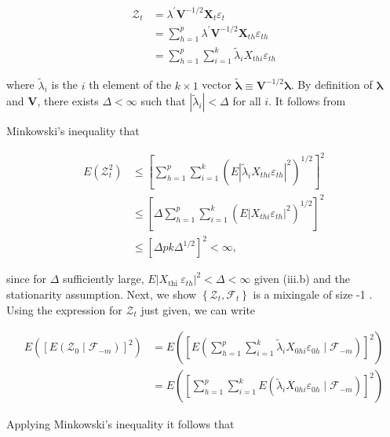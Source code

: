 \documentclass[10pt]{article}
\begin{document}
$$
\begin{aligned}
\mathcal{Z}_{t} & =\lambda^{\prime} \mathbf{V}^{-1 / 2} \mathbf{X}_{t} \varepsilon_{t} \\
& =\sum_{h=1}^{p} \lambda^{\prime} \mathbf{V}^{-1 / 2} \mathbf{X}_{t h} \varepsilon_{t h} \\
& =\sum_{h=1}^{p} \sum_{i=1}^{k} \tilde{\lambda}_{i} X_{t h i} \varepsilon_{t h}
\end{aligned}
$$

where $\tilde{\lambda}_{i}$ is the $i$ th element of the $k \times 1$ vector $\tilde{\boldsymbol{\lambda}} \equiv \mathbf{V}^{-1 / 2} \boldsymbol{\lambda}$. By definition of $\boldsymbol{\lambda}$ and $\mathbf{V}$, there exists $\Delta<\infty$ such that $\left|\tilde{\lambda}_{i}\right|<\Delta$ for all $i$. It follows from

Minkowski's inequality that

$$
\begin{aligned}
E\left(\mathcal{Z}_{t}^{2}\right) & \leq\left[\sum_{h=1}^{p} \sum_{i=1}^{k}\left(E\left|\tilde{\lambda}_{i} X_{t h i} \varepsilon_{t h}\right|^{2}\right)^{1 / 2}\right]^{2} \\
& \leq\left[\Delta \sum_{h=1}^{p} \sum_{i=1}^{k}\left(E\left|X_{t h i} \varepsilon_{t h}\right|^{2}\right)^{1 / 2}\right]^{2} \\
& \leq\left[\Delta p k \Delta^{1 / 2}\right]^{2}<\infty,
\end{aligned}
$$

since for $\Delta$ sufficiently large, $E\left|X_{\text {thi }} \varepsilon_{t h}\right|^{2}<\Delta<\infty$ given (iii.b) and the stationarity assumption. Next, we show $\left\{\mathcal{Z}_{t}, \mathcal{F}_{t}\right\}$ is a mixingale of size -1 . Using the expression for $\mathcal{Z}_{t}$ just given, we can write

$$
\begin{aligned}
E\left(\left[E\left(\mathcal{Z}_{0} \mid \mathcal{F}_{-m}\right)\right]^{2}\right) & =E\left(\left[E\left(\sum_{h=1}^{p} \sum_{i=1}^{k} \tilde{\lambda}_{i} X_{0 h i} \varepsilon_{0 h} \mid \mathcal{F}_{-m}\right)\right]^{2}\right) \\
& =E\left(\left[\sum_{h=1}^{p} \sum_{i=1}^{k} E\left(\tilde{\lambda}_{i} X_{0 h i} \varepsilon_{0 h} \mid \mathcal{F}_{-m}\right)\right]^{2}\right)
\end{aligned}
$$

Applying Minkowski's inequality it follows that
\end{document}
